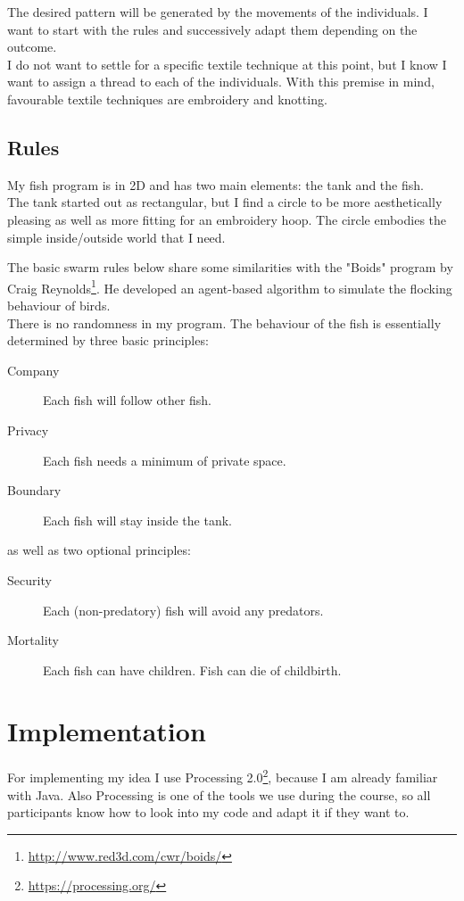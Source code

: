 \documentclass{scrartcl}
\begin{document}
The desired pattern will be generated by the movements of the individuals. I want to start with the rules and successively adapt them depending on the outcome.\\
I do not want to settle for a specific textile technique at this point, but I know I want to assign a thread to each of the individuals. With this premise in mind, favourable textile techniques are embroidery and knotting.


\subsection{Rules}

My fish program is in 2D and has two main elements: the tank and the fish.\\

The tank started out as rectangular, but I find a circle to be more aesthetically pleasing as well as more fitting for an embroidery hoop. The circle embodies the simple inside/outside world that I need.

The basic swarm rules below share some similarities with the "Boids" program by Craig Reynolds\footnote{\url{http://www.red3d.com/cwr/boids/}}. He developed an agent-based algorithm to simulate the flocking behaviour of birds.\\

There is no randomness in my program. The behaviour of the fish is essentially determined by three basic principles:
\begin{description}
\item[Company] Each fish will follow other fish.
\item[Privacy] Each fish needs a minimum of private space.
\item[Boundary] Each fish will stay inside the tank.
\end{description}
as well as two optional principles:
\begin{description}
\item[Security] Each (non-predatory) fish will avoid any predators.
\item[Mortality] Each fish can have children. Fish can die of childbirth.
\end{description}

\section{Implementation}

For implementing my idea I use Processing 2.0\footnote{\url{https://processing.org/}}, because I am already familiar with Java. Also Processing is one of the tools we use during the course, so all participants know how to look into my code and adapt it if they want to.\\
\end{document}

